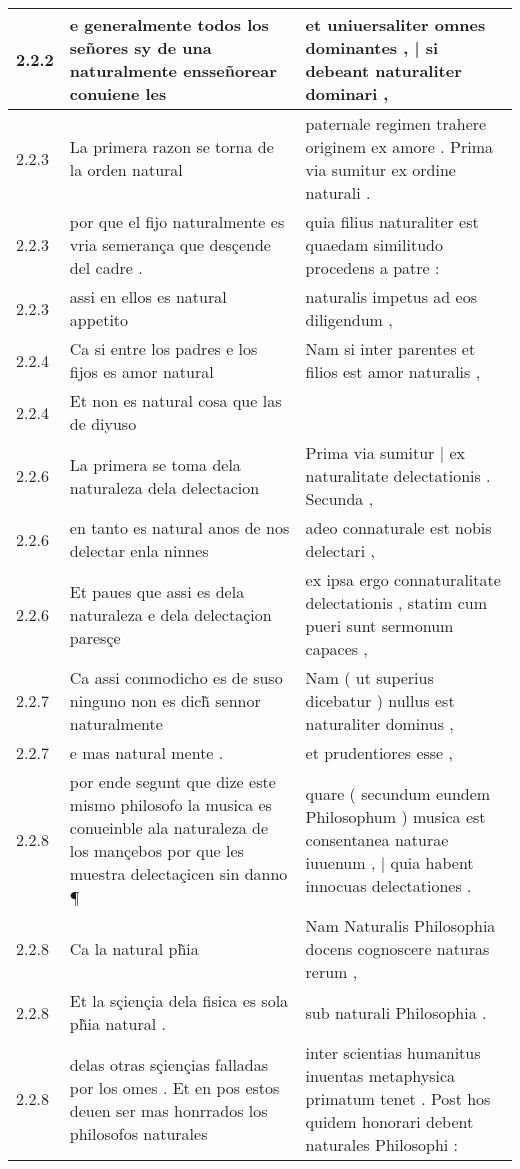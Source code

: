 \begin{tabular}{|p{1cm}|p{6.5cm}|p{6.5cm}|}
2.2.2 & e generalmente todos los señores sy de una naturalmente ensseñorear conuiene les & et uniuersaliter omnes dominantes , | si debeant naturaliter dominari , \\\hline
2.2.3 & La primera razon se torna de la orden natural & paternale regimen trahere originem ex amore . Prima via sumitur ex ordine naturali . \\\hline
2.2.3 & por que el fijo naturalmente es vria semerança que desçende del cadre . & quia filius naturaliter est quaedam similitudo procedens a patre : \\\hline
2.2.3 & assi en ellos es natural appetito & naturalis impetus ad eos diligendum , \\\hline
2.2.4 & Ca si entre los padres e los fijos es amor natural & Nam si inter parentes et filios est amor naturalis , \\\hline
2.2.4 & Et non es natural cosa que las de diyuso &  \\\hline
2.2.6 & La primera se toma dela naturaleza dela delectacion & Prima via sumitur | ex naturalitate delectationis . Secunda , \\\hline
2.2.6 & en tanto es natural anos de nos delectar enla ninnes & adeo connaturale est nobis delectari , \\\hline
2.2.6 & Et paues que assi es dela naturaleza e dela delectaçion paresçe & ex ipsa ergo connaturalitate delectationis , statim cum pueri sunt sermonum capaces , \\\hline
2.2.7 & Ca assi conmodicho es de suso ninguno non es dich̃ sennor naturalmente & Nam ( ut superius dicebatur ) nullus est naturaliter dominus , \\\hline
2.2.7 & e mas natural mente . & et prudentiores esse , \\\hline
2.2.8 & por ende segunt que dize este mismo philosofo la musica es conueinble ala naturaleza de los mançebos por que les muestra delectaçicen sin danno ¶ & quare ( secundum eundem Philosophum ) musica est consentanea naturae iuuenum , | quia habent innocuas delectationes . \\\hline
2.2.8 & Ca la natural ph̃ia & Nam Naturalis Philosophia docens cognoscere naturas rerum , \\\hline
2.2.8 & Et la sçiençia dela fisica es sola ph̃ia natural . & sub naturali Philosophia . \\\hline
2.2.8 & delas otras sçiençias falladas por los omes . Et en pos estos deuen ser mas honrrados los philosofos naturales & inter scientias humanitus inuentas metaphysica primatum tenet . Post hos quidem honorari debent naturales Philosophi : \\\hline

\end{tabular}
